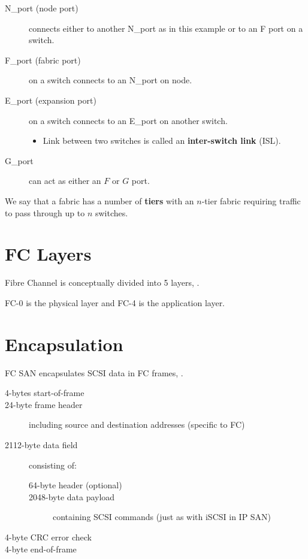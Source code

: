 \begin{description}
\item[N\_port (node port)]
connects either to another N\_port as in this example or to an F port on
a switch.
\item[F\_port (fabric port)]
on a switch connects to an N\_port on node.
\item[E\_port (expansion port)]
on a switch connects to an E\_port on another switch.

\begin{itemize}

\item
  Link between two switches is called an \textbf{inter-switch link}
  (ISL).
\end{itemize}
\item[G\_port]
can act as either an \(F\) or \(G\) port.
\end{description}

We say that a fabric has a number of \textbf{tiers} with an \(n\)-tier
fabric requiring traffic to pass through up to \(n\) switches.

\section{FC Layers}
\label{sec:fc-layers}

Fibre Channel is conceptually divided into 5 layers, .


FC-0 is the physical layer and FC-4 is the application layer.

\section{Encapsulation}\label{encapsulation}

FC SAN encapsulates SCSI data in FC frames, .


\begin{description}
\item[4-bytes start-of-frame]
\item[24-byte frame header]
including source and destination addresses (specific to FC)
\item[2112-byte data field]
consisting of:

\begin{description}
\item[64-byte header (optional)]
\item[2048-byte data payload]
containing SCSI commands (just as with iSCSI in IP SAN)
\end{description}
\item[4-byte CRC error check]
\item[4-byte end-of-frame]
\end{description}

